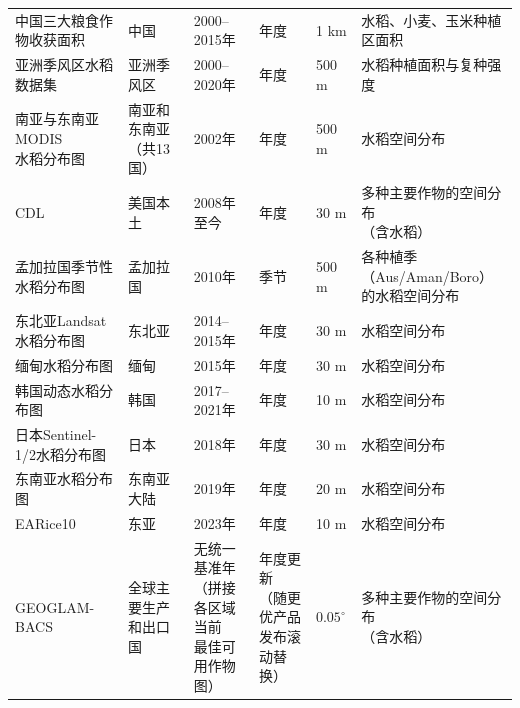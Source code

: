 \begin{longtable}{@{}m{}m{}m{}m{}m{}m{}@{}}
中国三大粮食作物收获面积\cite{Luo2020ChinaHarvest}
& 中国
& 2000--2015年
& 年度
& 1 km
& 水稻、小麦、玉米种植区面积 \\

亚洲季风区水稻数据集\cite{Han2022AsianMonsoonRice}
& 亚洲季风区
& 2000--2020年
& 年度
& 500 m
& 水稻种植面积与复种强度 \\

\makecell[l]{南亚与东南亚 MODIS\\[-3pt]水稻分布图\cite{Xiao2006}}
& \makecell[l]{南亚和东南亚\\[-3pt]（共13国）}
& 2002年
& 年度
& 500 m
& 水稻空间分布\\

CDL \cite{Boryan2011CDL}
& 美国本土
& 2008年至今
& 年度
& 30 m
& \makecell[l]{多种主要作物的空间分布\\[-3pt]（含水稻）}\\

孟加拉国季节性水稻分布图\cite{Gumma2014}
& 孟加拉国
& 2010年
& 季节
& 500 m
& \makecell[l]{各种植季（Aus/Aman/Boro）\\[-3pt] 的水稻空间分布} \\

东北亚Landsat水稻分布图\cite{Dong2016RSEGEE}
& 东北亚
& 2014--2015年
& 年度
& 30 m
& 水稻空间分布\\

缅甸水稻分布图\cite{Torbick2017}
& 缅甸
& 2015年
& 年度
& 30 m
& 水稻空间分布\\

韩国动态水稻分布图\cite{Jo2023KoreaDynamicRice}
& 韩国
& 2017--2021年
& 年度
& 10 m
& 水稻空间分布 \\

日本Sentinel-1/2水稻分布图\cite{Inoue2020JapanPaddy}
& 日本
& 2018年
& 年度
& 30 m
& 水稻空间分布 \\

东南亚水稻分布图\cite{Sun2023SEAsiaRice20m}
& 东南亚大陆
& 2019年
& 年度
& 20 m
& 水稻空间分布 \\

EARice10\cite{Song2025EARice10}
& 东亚
& 2023年
& 年度
& 10 m
& 水稻空间分布\\

GEOGLAM-BACS\cite{BeckerReshef2023GEOGLAMBACS}
& 全球主要生产和出口国
& \makecell[l]{无统一基准年\\[-3pt]（拼接各区域当前\\[-3pt]最佳可用作物图）}
& \makecell[l]{年度更新\\[-3pt]（随更优产品\\[-3pt] 发布滚动替换）}
& $0.05^\circ$
& \makecell[l]{多种主要作物的空间分布\\[-3pt] （含水稻）} \\

\end{longtable}
\endgroup

